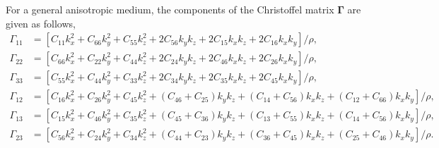 For a general anisotropic medium, the components of the  Christoffel matrix
$\mathbf{\Gamma}$ are given as follows,
\begin{equation}
\label{eq:gama}
\begin{split}
\Gamma_{11} &= [C_{11}k^2_x + C_{66}k^2_y + C_{55}k^2_z +2C_{56}k_yk_z +2C_{15}k_xk_z +2C_{16}k_xk_y]/{\rho}, \\
\Gamma_{22} &= [C_{66}k^2_x + C_{22}k^2_y + C_{44}k^2_z +2C_{24}k_yk_z +2C_{46}k_xk_z +2C_{26}k_xk_y]/{\rho}, \\
\Gamma_{33} &= [C_{55}k^2_x + C_{44}k^2_y + C_{33}k^2_z +2C_{34}k_yk_z +2C_{35}k_xk_z +2C_{45}k_xk_y]/{\rho}, \\
\Gamma_{12} &= [C_{16}k^2_x + C_{26}k^2_y + C_{45}k^2_z +(C_{46}+C_{25})k_yk_z +(C_{14}+C_{56})k_xk_z +(C_{12}+C_{66})k_xk_y]/{\rho}, \\
\Gamma_{13} &= [C_{15}k^2_x + C_{46}k^2_y + C_{35}k^2_z +(C_{45}+C_{36})k_yk_z +(C_{13}+C_{55})k_xk_z +(C_{14}+C_{56})k_xk_y]/{\rho}, \\
\Gamma_{23} &= [C_{56}k^2_x + C_{24}k^2_y + C_{34}k^2_z +(C_{44}+C_{23})k_yk_z +(C_{36}+C_{45})k_xk_z +(C_{25}+C_{46})k_xk_y]/{\rho}. 
\end{split}
\end{equation}

